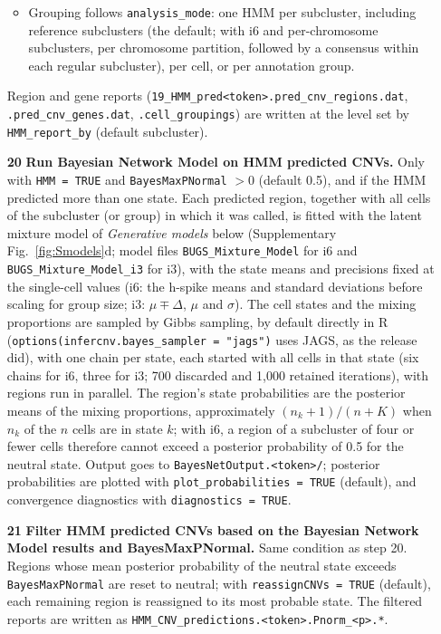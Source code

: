 \begin{enumerate}
\begin{itemize}
\item Grouping follows \texttt{analysis\_mode}: one HMM per subcluster, including reference subclusters (the default; with i6 and per-chromosome subclusters, per chromosome partition, followed by a consensus within each regular subcluster), per cell, or per annotation group.
\end{itemize}
Region and gene reports (\texttt{19\_HMM\_pred<token>.pred\_cnv\_regions.dat}, \texttt{.pred\_cnv\_genes.dat}, \texttt{.cell\_groupings}) are written at the level set by \texttt{HMM\_report\_by} (default subcluster).

\item[\textbf{20}] \textbf{Run Bayesian Network Model on HMM predicted CNVs.} Only with \texttt{HMM\ =\ TRUE} and \texttt{BayesMaxPNormal} $> 0$ (default 0.5), and if the HMM predicted more than one state. Each predicted region, together with all cells of the subcluster (or group) in which it was called, is fitted with the latent mixture model of \emph{Generative models} below (Supplementary Fig.~\ref{fig:Smodels}d; model files \texttt{BUGS\_Mixture\_Model} for i6 and \texttt{BUGS\_Mixture\_Model\_i3} for i3), with the state means and precisions fixed at the single-cell values (i6: the h-spike means and standard deviations before scaling for group size; i3: $\mu \mp \Delta$, $\mu$ and $\sigma$). The cell states and the mixing proportions are sampled by Gibbs sampling, by default directly in R (\texttt{options(infercnv.bayes\_sampler\ =\ "jags")} uses JAGS, as the release did), with one chain per state, each started with all cells in that state (six chains for i6, three for i3; 700 discarded and 1,000 retained iterations), with regions run in parallel. The region's state probabilities are the posterior means of the mixing proportions, approximately $(n_k+1)/(n+K)$ when $n_k$ of the $n$ cells are in state $k$; with i6, a region of a subcluster of four or fewer cells therefore cannot exceed a posterior probability of 0.5 for the neutral state. Output goes to \texttt{BayesNetOutput.<token>/}; posterior probabilities are plotted with \texttt{plot\_probabilities\ =\ TRUE} (default), and convergence diagnostics with \texttt{diagnostics\ =\ TRUE}.

\item[\textbf{21}] \textbf{Filter HMM predicted CNVs based on the Bayesian Network Model results and BayesMaxPNormal.} Same condition as step 20. Regions whose mean posterior probability of the neutral state exceeds \texttt{BayesMaxPNormal} are reset to neutral; with \texttt{reassignCNVs\ =\ TRUE} (default), each remaining region is reassigned to its most probable state. The filtered reports are written as \texttt{HMM\_CNV\_predictions.<token>.Pnorm\_<p>.*}.


\end{enumerate}
